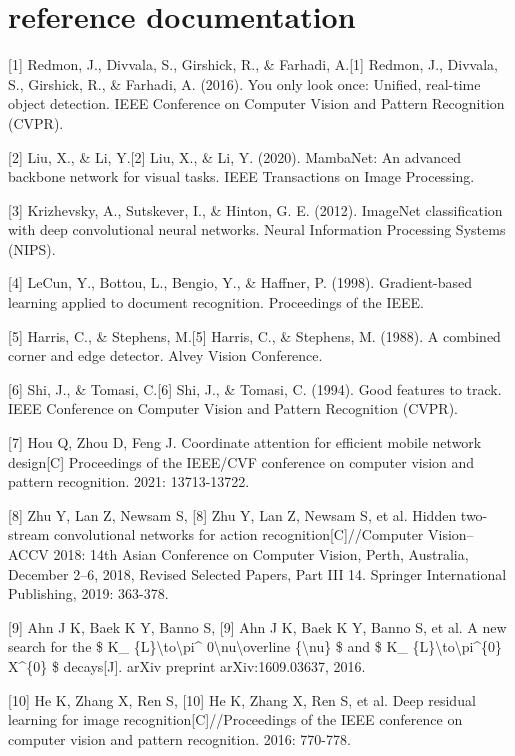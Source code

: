 \documentclass[
]{article}
\begin{document}
\section{reference documentation}\label{reference-documentation}

{[}1{]} Redmon, J., Divvala, S., Girshick, R., \& Farhadi, A.{[}1{]}
Redmon, J., Divvala, S., Girshick, R., \& Farhadi, A. (2016). You only
look once: Unified, real-time object detection. IEEE Conference on
Computer Vision and Pattern Recognition (CVPR).

{[}2{]} Liu, X., \& Li, Y.{[}2{]} Liu, X., \& Li, Y. (2020). MambaNet:
An advanced backbone network for visual tasks. IEEE Transactions on
Image Processing.

{[}3{]} Krizhevsky, A., Sutskever, I., \& Hinton, G. E. (2012). ImageNet
classification with deep convolutional neural networks. Neural
Information Processing Systems (NIPS).

{[}4{]} LeCun, Y., Bottou, L., Bengio, Y., \& Haffner, P. (1998).
Gradient-based learning applied to document recognition. Proceedings of
the IEEE.

{[}5{]} Harris, C., \& Stephens, M.{[}5{]} Harris, C., \& Stephens, M.
(1988). A combined corner and edge detector. Alvey Vision Conference.

{[}6{]} Shi, J., \& Tomasi, C.{[}6{]} Shi, J., \& Tomasi, C. (1994).
Good features to track. IEEE Conference on Computer Vision and Pattern
Recognition (CVPR).

{[}7{]} Hou Q, Zhou D, Feng J. Coordinate attention for efficient mobile
network design{[}C{]} Proceedings of the IEEE/CVF conference on computer
vision and pattern recognition. 2021: 13713-13722.

{[}8{]} Zhu Y, Lan Z, Newsam S, {[}8{]} Zhu Y, Lan Z, Newsam S, et al.
Hidden two-stream convolutional networks for action
recognition{[}C{]}//Computer Vision--ACCV 2018: 14th Asian Conference on
Computer Vision, Perth, Australia, December 2--6, 2018, Revised Selected
Papers, Part III 14. Springer International Publishing, 2019: 363-378.

{[}9{]} Ahn J K, Baek K Y, Banno S, {[}9{]} Ahn J K, Baek K Y, Banno S,
et al. A new search for the \$ K\_
\{L\}\textbackslash to\textbackslash pi\^{}
0\textbackslash nu\textbackslash overline \{\textbackslash nu\} \$ and
\$ K\_ \{L\}\textbackslash to\textbackslash pi\^{}\{0\} X\^{}\{0\} \$
decays{[}J{]}. arXiv preprint arXiv:1609.03637, 2016.

{[}10{]} He K, Zhang X, Ren S, {[}10{]} He K, Zhang X, Ren S, et al.
Deep residual learning for image recognition{[}C{]}//Proceedings of the
IEEE conference on computer vision and pattern recognition. 2016:
770-778.
\end{document}
